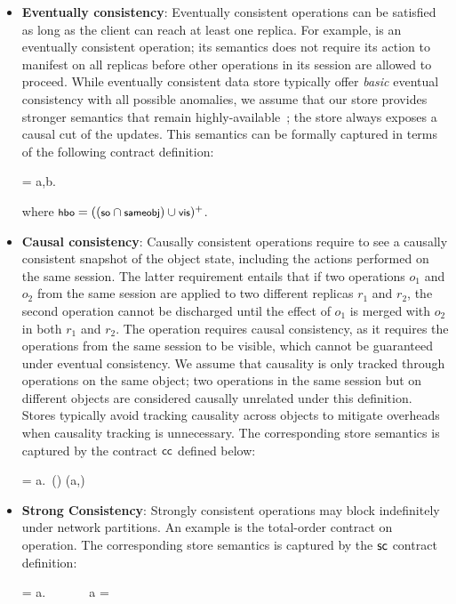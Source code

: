 \begin{itemize}
\setlength{\itemsep}{2pt}

\item \textbf{Eventually consistency}: Eventually consistent operations can
  be satisfied as long as the client can reach at least one replica. For
  example,  is an eventually consistent operation; its semantics
  does not require its action to manifest on all replicas before other
  operations in its session are allowed to proceed. While eventually
  consistent data store typically offer \emph{basic} eventual consistency
  with all possible anomalies, we assume that our store provides stronger
  semantics that remain highly-available~\cite{BailisHAT,COPS}; the store
  always exposes a causal cut of the updates. This semantics can be formally
  captured in terms of the following contract definition:
  \vspace{-0.8em}
  \begin{smathpar}
  \ecc = \forall a,b. ~ \wedge {} \Rightarrow {}
  \end{smathpar}
  \noindent where $\small \hboZ = ((\soZ \cap \sameobjZ) \cup \visZ)^+$.

\item \textbf{Causal consistency}: Causally consistent operations
  require to see a causally consistent snapshot of the object state,
  including the actions performed on the same session.  The latter
  requirement entails that if two operations $o_1$ and $o_2$ from the
  same session are applied to two different replicas $r_1$ and $r_2$,
  the second operation cannot be discharged until the effect of $o_1$ is
  merged with $o_2$ in both $r_1$ and $r_2$. The 
  operation requires causal consistency, as it requires the operations
  from the same session to be visible, which cannot be guaranteed under
  eventual consistency. We assume that causality is only tracked through
  operations on the same object; two operations in the same session but
  on different objects are considered causally unrelated under this
  definition. Stores typically avoid tracking causality across objects
  to mitigate overheads when causality tracking is unnecessary. The
  corresponding store semantics is captured by the contract ${\sf cc}$
  defined below:
  \vspace{-0.8em}
  \begin{smathpar}
  \ccc = \forall a.~(\hboZ \cap \sameobjZ) (a,\cureff) \Rightarrow {}
  \end{smathpar}

\item \textbf{Strong Consistency}: Strongly consistent operations may block
  indefinitely under network partitions. An example is the total-order
  contract on  operation. The corresponding store semantics is
  captured by the ${\sf sc}$ contract definition:
  \vspace{-0.8em}
  \begin{smathpar}
  \scc = \forall a.~ \Rightarrow {} ~\vee~  ~\vee~ a = \cureff
  \end{smathpar}

\end{itemize}

